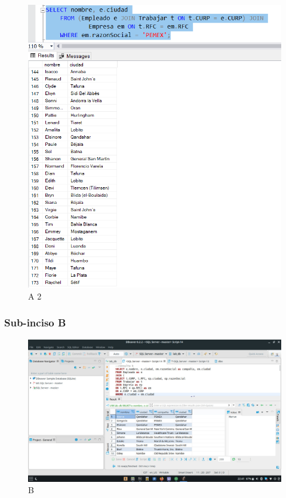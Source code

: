 \documentclass[a4paper, 12pt]{report}
\begin{document}
    \begin{figure}
        \includegraphics[width=\textwidth]
            {img/A2.png}\hfill
    \caption{A 2}
    \end{figure}

\subsubsection*{Sub-inciso B}
    \begin{figure}
        \includegraphics[width=\textwidth]
            {img/b1.jpeg}\hfill
        \caption{B}
    \end{figure}
\end{document}
